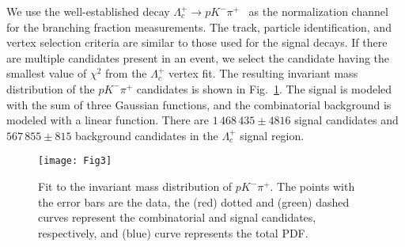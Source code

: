 \documentclass[aps,prl,twocolumn,superscriptaddress,showpacs,preprintnumbers,amsmath,amssymb]{revtex4-1}
\begin{document}

We use the well-established decay $\Lambda_c^+\to p K^-\pi^+$~\cite{PDG} as the normalization channel for the branching fraction measurements. 
The track, particle identification,  and vertex selection criteria are similar to those used for the signal decays. If there are multiple candidates present in an event, we select the candidate  having the smallest value of $\chi^2$ from the $\Lambda_c^+$ vertex fit.
The resulting invariant mass distribution of the $pK^-\pi^+$ candidates is shown in Fig.~\ref{fig:invmass_control_data}. The signal is modeled with the sum of three Gaussian functions, and the combinatorial background is modeled with a linear function. There are  $1\,468\,435\pm 4816$ signal candidates and $567\,855\pm815$ background candidates in the $\Lambda_c^+$ signal region.
\begin{figure}[htb]
\centering
\texttt{[image: Fig3]}
\caption{\small  Fit to the invariant mass distribution of $p K^-\pi^+$. The points with the error bars are the  data,  the (red) dotted and (green) dashed curves  represent the combinatorial and  signal  candidates, respectively, and (blue) curve represents the total PDF.}
\label{fig:invmass_control_data}
\end{figure}
\end{document}
